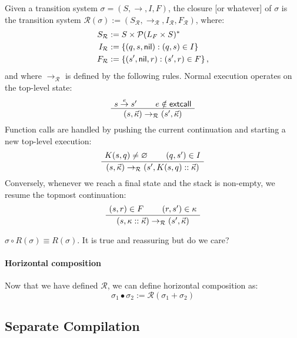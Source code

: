 \begin{definition}
Given a transition system $\sigma = (S, \rightarrow, I, F)$,
the closure [or whatever] of $\sigma$ is the transition system
$\mathcal{R}(\sigma) :=
  (S_\mathcal{R}, \rightarrow_\mathcal{R}, I_\mathcal{R}, F_\mathcal{R})$,
where:
\begin{align*}
  S_\mathcal{R} &:= S \times \mathcal{P}(L_F \times S)^* \\
  I_\mathcal{R} &:= \{ (q, s,  \textsf{nil} ) : (q, s) \in I \} \\
  F_\mathcal{R} &:= \{ (s',  \textsf{nil} , r) : (s', r) \in F \} \,,
\end{align*}
and where $\rightarrow_\mathcal{R}$ is defined
by the following rules.
Normal execution operates on the top-level state:
\[
  \AxiomC{$s \stackrel{e}{\rightarrow} s'$}
  \AxiomC{$e \notin \kw{extcall}$}
  \BinaryInfC{$(s, \vec{\kappa}) \rightarrow_\mathcal{R} (s', \vec{\kappa})$}
  \DisplayProof
\]
Function calls are handled by pushing the current continuation
and starting a new top-level execution:
\[
  \AxiomC{$K(s, q) \ne \varnothing$}
  \AxiomC{$(q, s') \in I$}
  \BinaryInfC{$(s, \vec{\kappa}) \rightarrow_\mathcal{R} (s', K(s, q) :: \vec{\kappa})$}
  \DisplayProof
\]
Conversely,
whenever we reach a final state
and the stack is non-empty,
we resume the topmost continuation:
\[
  \AxiomC{$(s, r) \in F$}
  \AxiomC{$(r, s') \in \kappa$}
  \BinaryInfC{$(s, \kappa :: \vec{\kappa}) \rightarrow_\mathcal{R} (s', \vec{\kappa})$}
  \DisplayProof
\]
\end{definition}

\begin{theorem}
$\sigma \circ R(\sigma) \equiv R(\sigma)$.
It is true and reassuring but do we care?
\end{theorem}


\paragraph{Horizontal composition} %

Now that we have defined $\mathcal{R}$,
we can define horizontal composition as:
\[
  \sigma_1 \bullet \sigma_2 := \mathcal{R}(\sigma_1 + \sigma_2)
\]



\subsection{Separate Compilation} %

